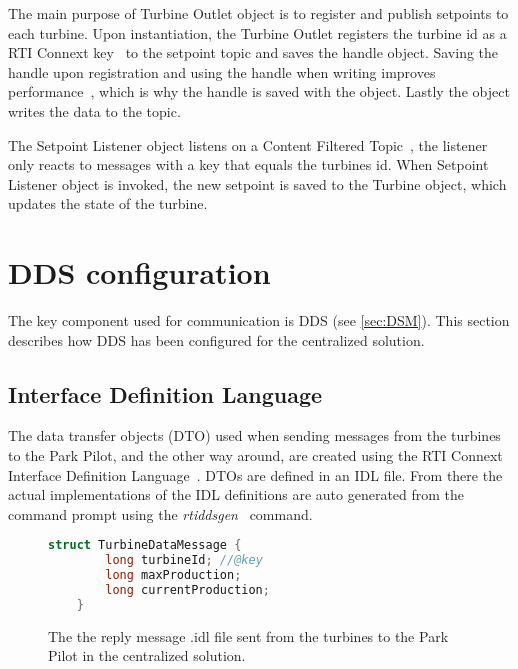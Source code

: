 The main purpose of Turbine Outlet object is to register and publish setpoints to each turbine. Upon instantiation, the Turbine Outlet registers the turbine id as a RTI Connext key~\cite{rtiConnextUsersManual} to the setpoint topic and saves the handle object. Saving the handle upon registration and using the handle when writing improves performance~\cite{DDSInstanceHandlet}, which is why the handle is saved with the object. Lastly the object writes the data to the topic.

The Setpoint Listener object listens on a Content Filtered Topic~\cite{rtiConnextUsersManual}, the listener only reacts to messages with a key that equals the turbines id. When Setpoint Listener object is invoked, the new setpoint is saved to the Turbine object, which updates the state of the turbine.

\section{DDS configuration}\label{sec:ddsConfigCen} 

The key component used for communication is DDS (see \cref{sec:DSM}). This section describes how DDS has been configured for the centralized solution.

\subsection{Interface Definition Language}\label{sec:cenIdl}

The data transfer objects (DTO) used when sending messages from the turbines to the Park Pilot, and the other way around, are created using the RTI Connext Interface Definition Language~\cite{rtiConnextUsersManual}. DTOs are defined in an IDL file. From there the actual implementations of the IDL definitions are auto generated from the command prompt using the \textit{rtiddsgen}~\cite{rtiConnextUsersManual} command.

\begin{figure}[!h]
	\centering
	\begin{lstlisting}[language=C++,tabsize=2,basicstyle=\small]
	struct TurbineDataMessage {
		long turbineId; //@key
		long maxProduction;
		long currentProduction;	
	}	
	\end{lstlisting}
	\caption[Centralized turbine reply message]{
		\label{fig:cenTurbineDataMessage} 
		\footnotesize{%
			The the reply message .idl file sent from the turbines to the Park Pilot in the centralized solution.
		}
	}
\end{figure}

